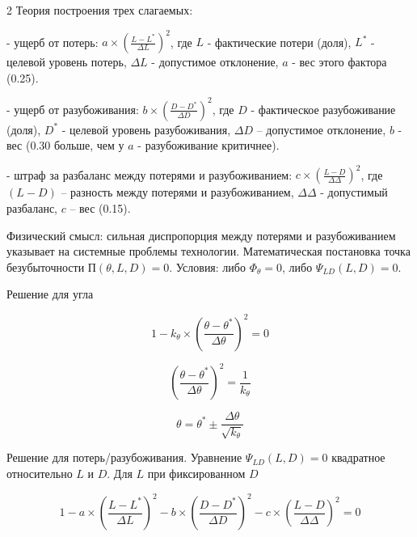\begin{multicols}{2}
Теория построения трех слагаемых:

- ущерб от потерь:
\(a \times \left( \frac{L - L^{*}}{\Delta L} \right)^{2}\), где
\(L\) - фактические потери (доля), \(L^{*}\) - целевой уровень потерь,
\(\Delta L\) - допустимое отклонение, \(a\) - вес этого фактора
(0.25).

- ущерб от разубоживания:
\(b \times \left( \frac{D - D^{*}}{\Delta D} \right)^{2}\), где
\(D\) - фактическое разубоживание (доля), \(D^{*}\) - целевой уровень
разубоживания, \(\Delta D\) -- допустимое отклонение, \(b\) -
вес (0.30 больше, чем у \(a\) - разубоживание критичнее).

- штраф за разбаланс между потерями и разубоживанием:
\(c \times \left( \frac{L - D}{\Delta \Delta } \right)^{2}\),
где \((L - D)\) -- разность между потерями и разубоживанием,
\(\Delta \Delta \) - допустимый разбаланс, \(c\) -- вес
(0.15).

Физический смысл: сильная диспропорция между потерями и разубоживанием
указывает на системные проблемы технологии. Математическая постановка
точка безубыточности \(П(\theta,L,D) = 0\). Условия: либо
\(\Phi_{\theta} = 0\), либо \(\Psi_{LD}(L,D) = 0\).

Решение для угла

\begin{equation}
1 - k_{\theta} \times \left( \frac{\theta - \theta^{*}}{\Delta \theta} \right)^{2} = 0
\end{equation}

\begin{equation}
\left( \frac{\theta - \theta^{*}}{\Delta \theta} \right)^{2} = \frac{1}{k_{\theta}}
\end{equation}

\begin{equation}
\theta = \theta^{*} \pm \frac{\Delta \theta}{\sqrt{k_{\theta}}}
\end{equation}

Решение для потерь/разубоживания. Уравнение \(\Psi_{LD}(L,D) = 0\)
квадратное относительно \(L\) и \(D\). Для \(L\) при фиксированном \(D\)
\end{multicols}

\begin{equation}
1 - a \times \left( \frac{L - L^{*}}{\Delta L} \right)^{2} - b \times \left( \frac{D - D^{*}}{\Delta D} \right)^{2} - c \times \left( \frac{L - D}{\Delta \Delta } \right)^{2} = 0
\end{equation}

